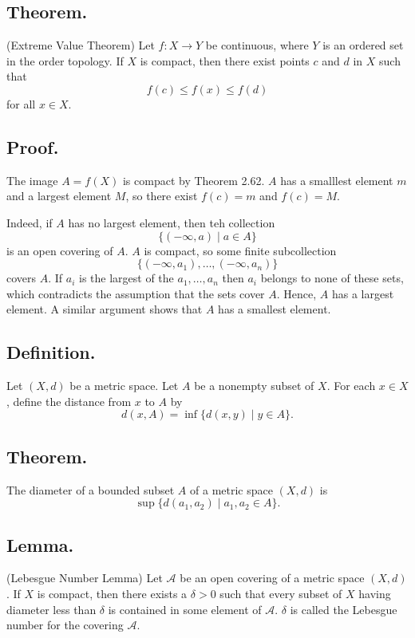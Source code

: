\documentclass[titlepage]{article}
\begin{document}
\subsection{Theorem.} (Extreme Value Theorem) Let $f: X \to Y$ be continuous, where $Y$ is an ordered set in the order topology. If $X$ is compact, then there exist points $c$ and $d$ in $X$ such that $$f(c) \leq f(x) \leq f(d)$$ for all $x \in X$.

\subsection{Proof.} The image $A = f(X)$ is compact by Theorem 2.62. $A$ has a smalllest element $m$ and a largest element $M$, so there exist $f(c) = m$ and $f(c) = M$.

Indeed, if $A$ has no largest element, then teh collection 
$$\{(-\infty, a) \mid a \in A \}$$
is an open covering of $A$. $A$ is compact, so some finite subcollection 
$$\{(-\infty, a_{1}), \ldots, (-\infty, a_{n})\}$$
covers $A$. If $a_{i}$ is the largest of the $a_{1}, \ldots, a_{n}$ then $a_{i}$ belongs to none of these sets, which contradicts the assumption that the sets cover $A$. Hence, $A$ has a largest element. A similar argument shows that $A$ has a smallest element.

\subsection{Definition.} Let $(X, d)$ be a metric space. Let $A$ be a nonempty subset of $X$. For each $x \in X$, define the distance from $x$ to $A$ by 
$$d(x, A) = \inf \{d(x, y) \mid y \in A\}.$$

\subsection{Theorem.} The diameter of a bounded subset $A$ of a metric space $(X, d)$ is 
$$\sup \{d(a_{1}, a_{2}) \mid a_{1}, a_{2} \in A\}.$$

\subsection{Lemma.} (Lebesgue Number Lemma) Let $\mathcal{A}$ be an open covering of a metric space $(X, d)$. If $X$ is compact, then there exists a $\delta > 0$ such that every subset of $X$ having diameter less than $\delta$ is contained in some element of $\mathcal{A}$. $\delta$ is called the Lebesgue number for the covering $\mathcal{A}$.
\end{document}
